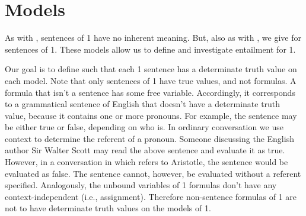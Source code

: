 \section{Models}\label{GQL1 Interpretations}

As with \GSL{}, sentences of \GQL{}1 have no inherent meaning.  
But, also as with \GSL{}, we give  for sentences of \GQL{}1.
These models allow us to define and investigate entailment for \GQL{}1.

Our goal is to define  such that each \GQL{}1 sentence has a determinate truth value on each model.
Note that only sentences of \GQL{}1 have true values, and not formulas.
A formula that isn't a sentence has some free variable.
Accordingly, it corresponds to a grammatical sentence of English that doesn't have a determinate truth value, because it contains one or more pronouns.
For example, the sentence  may be either true or false, depending on who  is.
In ordinary conversation we use context to determine the referent of a pronoun.
Someone discussing the English author Sir Walter Scott may read the above sentence and evaluate it as true.
However, in a conversation in which  refers to Aristotle, the sentence would be evaluated as false.
The sentence cannot, however, be evaluated without a referent specified.
Analogously, the unbound variables of \GQL{}1 formulas don't have any context-independent  (i.e., assignment).
Therefore non-sentence formulas of \GQL{}1 are not to have determinate truth values on the models of \GQL{}1.  


